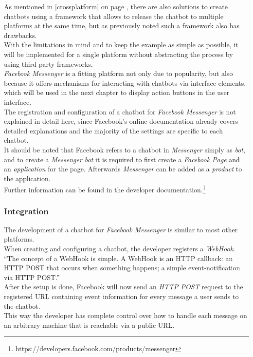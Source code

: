 As mentioned in \ref{crossplatform} on page \pageref{crossplatform},
there are also solutions to create chatbots using a framework that allows to release the chatbot to multiple platforms at the same time,
but as previously noted such a framework also has drawbacks.
\\
With the limitations in mind and to keep the example as simple as possible,
it will be implemented for a single platform without abstracting the process by using third-party frameworks.
\\

\emph{Facebook Messenger} is a fitting platform not only due to popularity,
but also because it offers mechanisms for interacting with chatbots via interface elements,
which will be used in the next chapter to display action buttons in the user interface.
\\

The registration and configuration of a chatbot for \emph{Facebook Messenger} is not explained in detail here,
since Facebook's online documentation already covers detailed explanations
and the majority of the settings are specific to each chatbot.
\\
It should be noted that Facebook refers to a chatbot in \emph{Messenger} simply as \emph{bot},
and to create a \emph{Messenger bot} it is required to first create a \emph{Facebook Page} and an \emph{application} for the page.
Afterwards \emph{Messenger} can be added as a \emph{product} to the application.
\\
Further information can be found in the developer documentation.\footnote{https://developers.facebook.com/products/messenger}

\subsubsection{Integration}

The development of a chatbot for \emph{Facebook Messenger} is similar to most other platforms.
\\
When creating and configuring a chatbot, the developer registers a \emph{WebHook}.
``The concept of a WebHook is simple. A WebHook is an HTTP callback: an HTTP POST that occurs when something happens; a simple event-notification via HTTP POST.''\cite{webhook}
\\
After the setup is done,
Facebook will now send an \emph{HTTP POST} request to the registered URL containing event information for every message a user sends to the chatbot.
\\
This way the developer has complete control over how to handle each message on an arbitrary machine that is reachable via a public URL.


